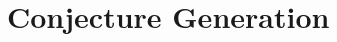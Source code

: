 \newcommand{\function}{\rightarrow}

\newcommand{\Zero}{\text{Z}}
\newcommand{\Succ}{\text{S}}
\newcommand{\plus}{\text{plus}}
\newcommand{\mult}{\text{times}}

\newcommand{\List}{\text{List}}
\newcommand{\ListA}{\text{List} \  a}
\newcommand{\Nil}{\text{Nil}}
\newcommand{\Cons}{\text{Cons}}
\newcommand{\Head}{\text{head}}
\newcommand{\Tail}{\text{tail}}
\newcommand{\Append}{\text{append}}
\newcommand{\Reverse}{\text{reverse}}
\newcommand{\Length}{\text{length}}
\newcommand{\Map}{\text{map}}
\newcommand{\Foldl}{\text{foldl}}
\newcommand{\Foldr}{\text{foldr}}

\section{Conjecture Generation}


